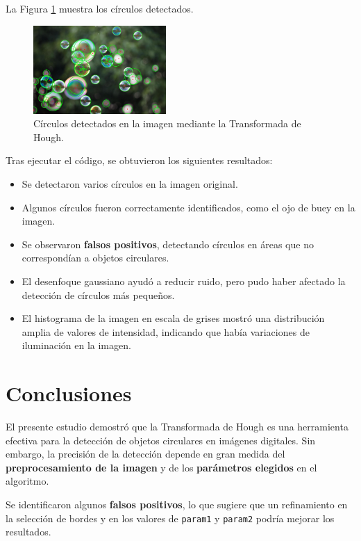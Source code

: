 \documentclass[conference]{IEEEtran}
\begin{document}
La Figura \ref{fig:circulos} muestra los círculos detectados.

\FloatBarrier

\begin{figure}[h]
    \centering
    \includegraphics[width=0.45\textwidth]{imagen_circulos.jpg}
    \caption{Círculos detectados en la imagen mediante la Transformada de Hough.}
    \label{fig:circulos}
\end{figure}

\FloatBarrier


Tras ejecutar el código, se obtuvieron los siguientes resultados:
\begin{itemize}
    \item Se detectaron varios círculos en la imagen original.
    \item Algunos círculos fueron correctamente identificados, como el ojo de buey en la imagen.
    \item Se observaron \textbf{falsos positivos}, detectando círculos en áreas que no correspondían a objetos circulares.
    \item El desenfoque gaussiano ayudó a reducir ruido, pero pudo haber afectado la detección de círculos más pequeños.
    \item El histograma de la imagen en escala de grises mostró una distribución amplia de valores de intensidad, indicando que había variaciones de iluminación en la imagen.
\end{itemize}



\section{Conclusiones}

El presente estudio demostró que la Transformada de Hough es una herramienta efectiva para la detección de objetos circulares en imágenes digitales. Sin embargo, la precisión de la detección depende en gran medida del \textbf{preprocesamiento de la imagen} y de los \textbf{parámetros elegidos} en el algoritmo.

Se identificaron algunos \textbf{falsos positivos}, lo que sugiere que un refinamiento en la selección de bordes y en los valores de \texttt{param1} y \texttt{param2} podría mejorar los resultados.
\end{document}
